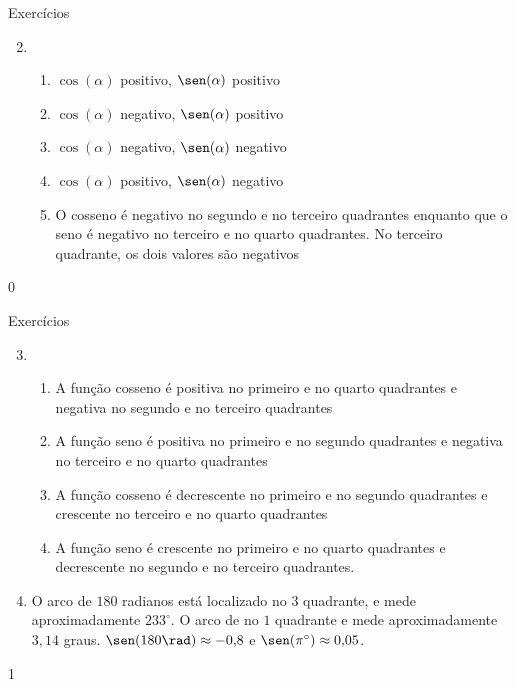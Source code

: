 \begin{answer}{Exercícios}
{\exerciselist
\begin{enumerate}\setcounter{enumi}{1}
\item 
\begin{enumerate}
\item $\cos(\alpha)$ positivo, $\sen(\alpha)$ positivo
\item $\cos(\alpha)$ negativo, $\sen(\alpha)$ positivo
\item $\cos(\alpha)$ negativo, $\sen(\alpha)$ negativo
\item $\cos(\alpha)$ positivo, $\sen(\alpha)$ negativo
\item O cosseno é negativo no segundo e no terceiro quadrantes enquanto que o seno é negativo no terceiro e no quarto quadrantes. No terceiro quadrante, os dois valores são negativos
\end{enumerate}
\end{enumerate}
}{0}
\end{answer}
\clearmargin
\begin{answer}{Exercícios}
{\exerciselist
\begin{enumerate}\setcounter{enumi}{2}
\item 
\begin{enumerate}
\item A função cosseno é positiva no primeiro e no quarto quadrantes e negativa no segundo e no terceiro quadrantes
\item A função seno é positiva no primeiro e no segundo quadrantes e negativa no terceiro e no quarto quadrantes
\item A função cosseno é decrescente no primeiro e no segundo quadrantes e crescente no terceiro e no quarto quadrantes
\item A função seno é crescente no primeiro e no quarto quadrantes e decrescente no segundo e no terceiro quadrantes.
\end{enumerate}
\item O arco de $180$ radianos está localizado no $3$ quadrante, e mede aproximadamente $233^{\circ}$. O arco de no $1$ quadrante e mede aproximadamente $3{,}14$ graus. $\sen(180\rad)\approx-0{,}8$ e $\sen(\pi^{\circ})\approx0{,}05$.
\end{enumerate}
}{1}
\end{answer}
\marginpar{\hrulefill}
\def\currentcolor{session3}
